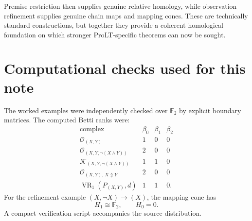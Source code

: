 \documentclass[11pt]{article}
\theoremstyle{definition}
\newcommand{\F}{\mathbb F_2}
\newcommand{\OX}{\mathcal O}
\newcommand{\K}{\mathcal K}
\newcommand{\VR}{\operatorname{VR}}
\newcommand{\xor}{\mathbin{\Updownarrow}}
\begin{document}
Premise restriction then supplies genuine relative homology, while observation refinement supplies genuine chain maps and mapping cones. These are technically standard constructions, but together they provide a coherent homological foundation on which stronger ProLT-specific theorems can now be sought.

\appendix
\section{Computational checks used for this note}

The worked examples were independently checked over $\F$ by explicit boundary matrices. The computed Betti ranks were:
\[
\begin{array}{c|ccc}
\text{complex} & \beta_0&\beta_1&\beta_2\\\hline
\OX_{(X,Y)} &1&0&0\\
\OX_{(X,Y,\neg(X\wedge Y))}&2&0&0\\
\K_{(X,Y,\neg(X\wedge Y))}&1&1&0\\
\OX_{(X,Y),\,X\xor Y}&2&0&0\\
\VR_1(P_{(X,Y)},d)&1&1&0.
\end{array}
\]
For the refinement example $(X,\neg X)\to(X)$, the mapping cone has
\[
H_1\cong\F,\qquad H_0=0.
\]
A compact verification script accompanies the source distribution.
\end{document}
